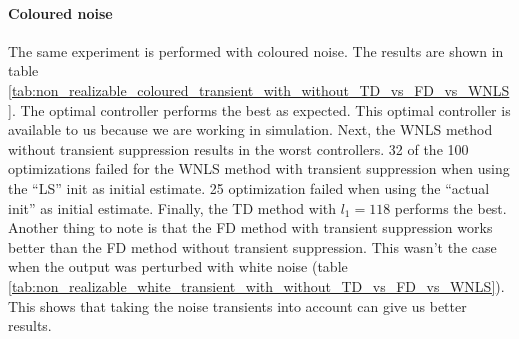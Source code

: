 \newpage
\paragraph{Coloured noise}
The same experiment is performed with coloured noise. The results are shown in table \ref{tab:non_realizable_coloured_transient_with_without_TD_vs_FD_vs_WNLS}. The optimal controller performs the best as expected. This optimal controller is available to us because we are working in simulation. Next, the WNLS method without transient suppression results in the worst controllers. 32 of the 100 optimizations failed for the WNLS method with transient suppression when using the ``LS'' init as initial estimate. 25 optimization failed when using the ``actual init'' as initial estimate. Finally, the TD method with $l_1 = 118$ performs the best. Another thing to note is that the FD method with transient suppression works better than the FD method without transient suppression. This wasn't the case when the output was perturbed with white noise (table \ref{tab:non_realizable_white_transient_with_without_TD_vs_FD_vs_WNLS}). This shows that taking the noise transients into account can give us better results.
 
